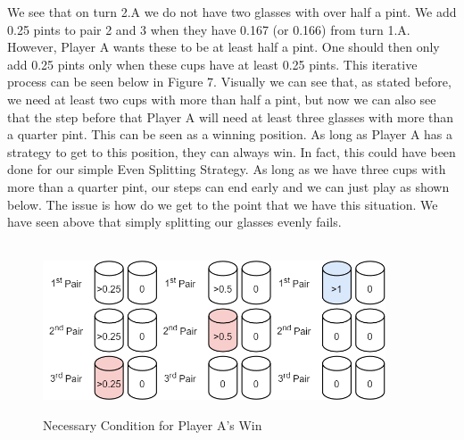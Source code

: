 \documentclass[11pt]{article}
\newcommand{\keywordfont}{\textsc}
\newcommand{\keyword}[1]{%
  \marginpar{\raggedright\small\keywordfont{#1}}}
\begin{document}
We see that on turn 2.A we do \keyword{AHA} not have two glasses with over half a pint. We add 0.25 pints to pair 2 and 3 when they have 0.167 (or 0.166) from turn 1.A. However, Player A wants these to be at least half a pint. One should then only add 0.25 pints only when these cups have at least 0.25 pints. This iterative process can be seen below in Figure 7. Visually we can see that, as stated before, we need at least two cups with more than half a pint, but now we can also see that the step before that Player A will need at least three glasses with more than a quarter pint. This can be seen as a winning position. As long as Player A has a strategy to get to this position, they can always win. In fact, this could have been done for our simple Even Splitting Strategy. As long as we have three cups with more than a quarter pint, our steps can end early and we can just play as shown below. The issue \keyword{Stuck} is how do we get to the point that we have this situation. We have seen above that simply splitting our glasses evenly fails.  \\
\\

\begin{figure}[h]
   \centering
   \includegraphics[width=4in]{3CupStrat.png}
   \label{myfig}
   \caption{Necessary Condition for Player A's Win}
\end{figure}
\end{document}
